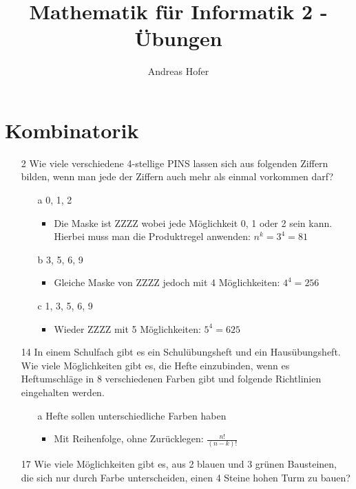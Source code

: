 \documentclass{article}
\title{\vspace{-1cm}Mathematik für Informatik 2 - Übungen}
\author{Andreas Hofer}
\begin{document}
	\maketitle
	\tableofcontents
	\section{Kombinatorik}
	\begin{itemize}
		\item[2]{Wie viele verschiedene 4-stellige PINS lassen sich aus folgenden Ziffern bilden, wenn man jede der Ziffern auch mehr als einmal vorkommen darf?}
		\begin{itemize}
			\item[a]{0, 1, 2}
			\begin{itemize}
				\item{Die Maske ist ZZZZ wobei jede Möglichkeit 0, 1 oder 2 sein kann. Hierbei muss man die Produktregel anwenden: $n^k=3^4=81$}
			\end{itemize}
			\item[b]{3, 5, 6, 9}
			\begin{itemize}
				\item{Gleiche Maske von ZZZZ jedoch mit 4 Möglichkeiten: $4^4=256$}
			\end{itemize}
			\item[c]{1, 3, 5, 6, 9}
			\begin{itemize}
				\item{Wieder ZZZZ mit 5 Möglichkeiten: $5^4=625$}
			\end{itemize}
		\end{itemize}
		\item[14]{In einem Schulfach gibt es ein Schulübungsheft und ein Hausübungsheft. Wie viele Möglichkeiten gibt es, die Hefte einzubinden, wenn es Heftumschläge in 8 verschiedenen Farben gibt und folgende Richtlinien eingehalten werden.}
		\begin{itemize}
			\item[a]{Hefte sollen unterschiedliche Farben haben}
			\begin{itemize}
				\item{Mit Reihenfolge, ohne Zurücklegen: $\frac{n!}{(n-k)!}$}
			\end{itemize}
		\end{itemize}
		\item[17]{Wie viele Möglichkeiten gibt es, aus 2 blauen und 3 grünen Bausteinen, die sich nur durch Farbe unterscheiden, einen 4 Steine hohen Turm zu bauen?}
		\begin{itemize}

\end{itemize}
\end{itemize}
\end{document}
